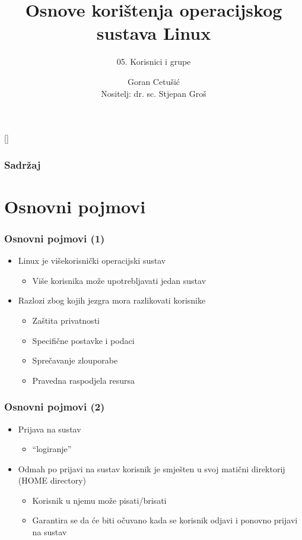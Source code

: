 \documentclass{beamer}
\title{Osnove korištenja operacijskog sustava Linux}
\subtitle{05. Korisnici i grupe}
\author[Goran Cetušić]{Goran Cetušić\\{\small Nositelj: dr. sc. Stjepan Groš}}
\institute[FER]{Sveučilište u Zagrebu \\
				Fakultet elektrotehnike i računarstva}
\date{\todayiso}
\begin{document}
{
[] %

\begin{frame}
\maketitle
\end{frame}
}

\begin{frame}
\frametitle{Sadržaj}
\tableofcontents
\end{frame}

\section{Osnovni pojmovi}
\begin{frame}[t]
\frametitle{Osnovni pojmovi (1)}
\begin{itemize}
  \item Linux je višekorisnički operacijski sustav
  \begin{itemize}
    \item Više korisnika može upotrebljavati jedan sustav
  \end{itemize}
  \item Razlozi zbog kojih jezgra mora razlikovati korisnike
  \begin{itemize}
    \item Zaštita privatnosti
    \item Specifične postavke i podaci
    \item Sprečavanje zlouporabe
    \item Pravedna raspodjela resursa
  \end{itemize}
\end{itemize}
\end{frame}

\begin{frame}[t]
\frametitle{Osnovni pojmovi (2)}
\begin{itemize}
  \item Prijava na sustav
  \begin{itemize}
    \item ``logiranje''
  \end{itemize}
  \item Odmah po prijavi na sustav korisnik je smješten u svoj matični 
        direktorij (HOME directory)
  \begin{itemize}
    \item Korisnik u njemu može pisati/brisati
    \item Garantira se da će biti očuvano kada se korisnik odjavi i 
          ponovno prijavi na sustav
  \end{itemize}
\end{itemize}
\end{frame}
\end{document}
